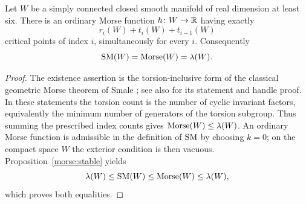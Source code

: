 \begin{theorem}[Smale]\label{morse:smale}
Let $W$ be a simply connected closed smooth manifold of real
dimension at least six.  There is an ordinary Morse function
$h\colon W\to\mathbb R$ having exactly
\[
 r_i(W)+t_i(W)+t_{i-1}(W)
\]
critical points of index $i$, simultaneously for every $i$.
Consequently
\[
 \operatorname{SM}(W)=\operatorname{Morse}(W)=\lambda(W).
\]
\end{theorem}

\begin{proof}
The existence assertion is the torsion-inclusive form of the
classical geometric Morse theorem of Smale
\cite[Theorem~2.4 and the following paragraph]{Smale1963}; see also
\cite[Theorem~2 and Section~6]{Cerf1962} for its statement and handle
proof.  In these statements the torsion count is the number of
cyclic invariant factors, equivalently the minimum number of
generators of the torsion subgroup.  Thus summing the prescribed
index counts gives $\operatorname{Morse}(W)\leq\lambda(W)$.
An ordinary Morse function is admissible in the definition of
$\operatorname{SM}$ by choosing $k=0$; on the compact space $W$ the exterior
condition is then vacuous.  Proposition~\ref{morse:stable} yields
\[
 \lambda(W)\leq\operatorname{SM}(W)\leq\operatorname{Morse}(W)\leq\lambda(W),
\]
which proves both equalities.
\end{proof}
